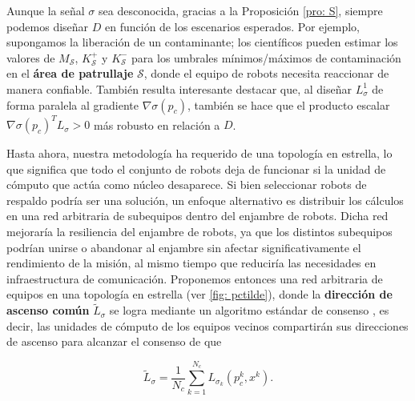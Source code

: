 Aunque la señal $\sigma$ sea desconocida, gracias a la Proposición \ref{pro: S}, siempre podemos diseñar $D$ en función de los escenarios esperados. Por ejemplo, supongamos la liberación de un contaminante; los científicos pueden estimar los valores de $M_\mathcal{S}$, $K_\mathcal{S}^+$ y $K_\mathcal{S}^-$ para los umbrales mínimos/máximos de contaminación en el \textbf{área de patrullaje} $\mathcal{S}$, donde el equipo de robots necesita reaccionar de manera confiable. También resulta interesante destacar que, al diseñar $L^1_\sigma$ de forma paralela al gradiente $\nabla\sigma(p_c)$, también se hace que el producto escalar $\nabla\sigma(p_c)^TL_\sigma > 0$ más robusto en relación a $D$.

Hasta ahora, nuestra metodología ha requerido de una topología en estrella, lo que significa que todo el conjunto de robots deja de funcionar si la unidad de cómputo que actúa como núcleo desaparece. Si bien seleccionar robots de respaldo podría ser una solución, un enfoque alternativo es distribuir los cálculos en una red arbitraria de subequipos dentro del enjambre de robots. Dicha red mejoraría la resiliencia del enjambre de robots, ya que los distintos subequipos podrían unirse o abandonar al enjambre sin afectar significativamente el rendimiento de la misión, al mismo tiempo que reduciría las necesidades en infraestructura de comunicación. Proponemos entonces una red arbitraria de equipos en una topología en estrella (ver \autoref{fig: pctilde}), donde la \textbf{dirección de ascenso común} $\tilde L_\sigma$ se logra mediante un algoritmo estándar de consenso \cite{olfati2004consensus}, es decir, las unidades de cómputo de los equipos vecinos compartirán sus direcciones de ascenso para alcanzar el consenso de que

\begin{equation} \label{l_sigma_tilde}
\tilde L_\sigma = \frac{1}{N_c}\sum^{N_c}_{k=1}L_{\sigma_k}(p_c^k, x^k).
\end{equation}

\newpage

\vspace{0.3cm}

